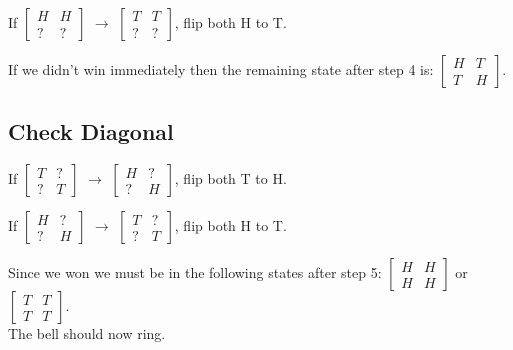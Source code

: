 \documentclass{article}
\begin{document}
\begin{center}
If $\begin{bmatrix}
    H & H \\
    ? & ? 
\end{bmatrix}$ $\rightarrow$ $\begin{bmatrix}
    T & T  \\
    ? & ? 
\end{bmatrix}$, flip both H to T.
\end{center}

If we didn't win immediately then the remaining state after step 4 is:
$\begin{bmatrix} 
    H & T \\
    T & H
\end{bmatrix}$.

\subsection{Check Diagonal}

\begin{center}
If $\begin{bmatrix} 
    T & ? \\
    ? & T 
\end{bmatrix}$ $\rightarrow$ $\begin{bmatrix}
    H & ? \\
    ? & H 
\end{bmatrix}$, flip both T to H.
\end{center}

\begin{center}
If $\begin{bmatrix} 
    H & ? \\
    ? & H
\end{bmatrix}$ $\rightarrow$ $\begin{bmatrix}
    T & ? \\
    ? & T 
\end{bmatrix}$, flip both H to T.
\end{center}

Since we won we must be in the following states after step 5:
$\begin{bmatrix} 
    H & H \\
    H & H
\end{bmatrix}$ or $\begin{bmatrix} 
    T & T \\
    T & T
\end{bmatrix}$.
\\
The bell should now ring.
\end{document}
